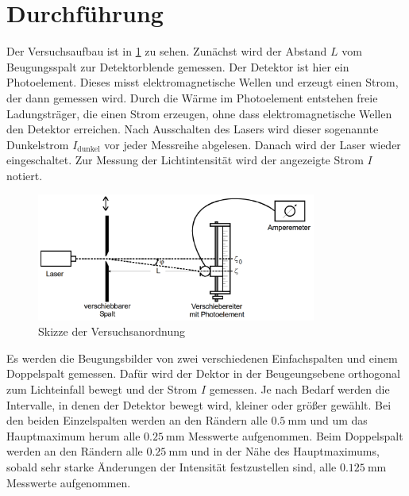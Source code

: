 \section{Durchführung}
\label{sec:Durchführung}

Der Versuchsaufbau ist in \ref{fig:aufbau} zu sehen. Zunächst wird der Abstand $L$
vom Beugungsspalt zur Detektorblende gemessen. Der Detektor ist hier ein Photoelement.
Dieses misst elektromagnetische Wellen und erzeugt einen Strom, der dann gemessen wird.
Durch die Wärme im Photoelement entstehen freie Ladungsträger, die einen Strom erzeugen,
ohne dass elektromagnetische Wellen den Detektor erreichen. Nach Ausschalten des Lasers
wird dieser sogenannte Dunkelstrom $I_\text{dunkel}$ vor jeder Messreihe abgelesen.
Danach wird der Laser wieder eingeschaltet. Zur Messung der Lichtintensität wird der
angezeigte Strom $I$ notiert.

\begin{figure}
  \centering
  \includegraphics[width=260pt]{data/aufbau.png}
  \caption{Skizze der Versuchsanordnung \cite{Versuchsanleitung}}
  \label{fig:aufbau}
\end{figure}

Es werden die Beugungsbilder von zwei verschiedenen Einfachspalten und einem Doppelspalt
gemessen. Dafür wird der Dektor in der Beugeungsebene orthogonal zum Lichteinfall
bewegt und der Strom $I$ gemessen. Je nach Bedarf werden die Intervalle, in denen der
Detektor bewegt wird, kleiner oder größer gewählt. Bei den beiden Einzelspalten
werden an den Rändern alle $\SI{0.5}{\milli\meter}$ und um das Hauptmaximum herum alle
$\SI{0.25}{\milli\meter}$ Messwerte aufgenommen. Beim Doppelspalt werden an den Rändern
alle $\SI{0.25}{\milli\meter}$ und in der Nähe des Hauptmaximums, sobald sehr starke
Änderungen der Intensität festzustellen sind, alle $\SI{0.125}{\milli\meter}$
Messwerte aufgenommen.
